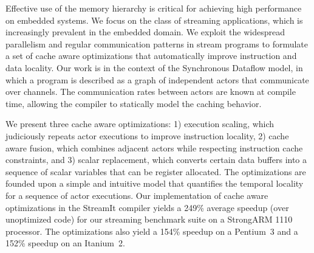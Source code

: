 Effective use of the memory hierarchy is critical for achieving high
performance on embedded systems.  We focus on the class of streaming
applications, which is increasingly prevalent in the embedded domain.  We
exploit the widespread parallelism and regular communication patterns
in stream programs to formulate a set of cache aware optimizations
that automatically improve instruction and data locality.  Our work is
in the context of the Synchronous Dataflow model, in which a program
is described as a graph of independent actors that communicate over
channels.  The communication rates between actors are known at compile
time, allowing the compiler to statically model the caching behavior.

We present three cache aware optimizations: 1) execution scaling,
which judiciously repeats actor executions to improve instruction
locality, 2) cache aware fusion, which combines adjacent actors while
respecting instruction cache constraints, and 3) scalar replacement,
which converts certain data buffers into a sequence of scalar
variables that can be register allocated.  The optimizations are
founded upon a simple and intuitive model that quantifies the temporal
locality for a sequence of actor executions.  Our implementation of
cache aware optimizations in the StreamIt compiler yields a 249\%
average speedup (over unoptimized code) for our streaming benchmark
suite on a StrongARM 1110 processor.  The optimizations also yield a
154\% speedup on a Pentium~3 and a 152\% speedup on an Itanium~2.
